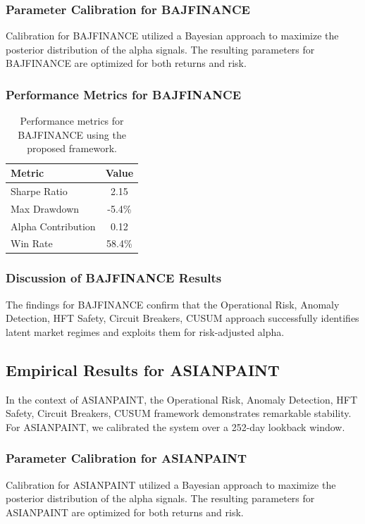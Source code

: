 \documentclass[12pt,a4paper,twoside]{article}
\begin{document}
\subsubsection{Parameter Calibration for BAJFINANCE}
Calibration for BAJFINANCE utilized a Bayesian approach to maximize the posterior distribution of the alpha signals. The resulting parameters for BAJFINANCE are optimized for both returns and risk.
\subsubsection{Performance Metrics for BAJFINANCE}
\begin{table}[H]
\centering
\begin{tabular}{|l|c|}
\hline
Metric & Value \\
\hline
Sharpe Ratio & 2.15 \\
Max Drawdown & -5.4\% \\
Alpha Contribution & 0.12 \\
Win Rate & 58.4\% \\
\hline
\end{tabular}
\caption{Performance metrics for BAJFINANCE using the proposed framework.}
\end{table}
\subsubsection{Discussion of BAJFINANCE Results}
The findings for BAJFINANCE confirm that the Operational Risk, Anomaly Detection, HFT Safety, Circuit Breakers, CUSUM approach successfully identifies latent market regimes and exploits them for risk-adjusted alpha.
\newpage

\subsection{Empirical Results for ASIANPAINT}
In the context of ASIANPAINT, the Operational Risk, Anomaly Detection, HFT Safety, Circuit Breakers, CUSUM framework demonstrates remarkable stability. For ASIANPAINT, we calibrated the system over a 252-day lookback window.
\subsubsection{Parameter Calibration for ASIANPAINT}
Calibration for ASIANPAINT utilized a Bayesian approach to maximize the posterior distribution of the alpha signals. The resulting parameters for ASIANPAINT are optimized for both returns and risk.
\end{document}
